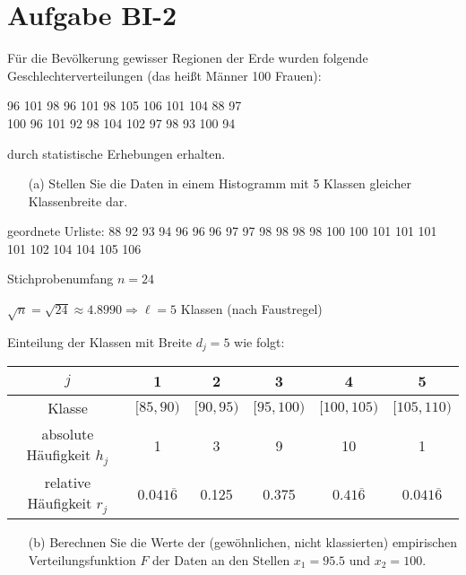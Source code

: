 
\section{Aufgabe BI-2}

\begin{task}
    Für die Bevölkerung gewisser Regionen der Erde wurden folgende Geschlechterverteilungen (das heißt Männer 100 Frauen):
    \begin{tightcenter}
        96  101  98  96  101  98  105  106  101  104  88  97 \\
        100  96  101  92  98  104  102  97  98  93  100  94
    \end{tightcenter}
    durch statistische Erhebungen erhalten.

    \begin{enumerate}
        \item[(a)] Stellen Sie die Daten in einem Histogramm mit 5 Klassen gleicher Klassenbreite dar.
    \end{enumerate}
\end{task}

geordnete Urliste: 88 92 93 94 96 96 96 97 97 98 98 98 98 100 100 101 101 101 101 102 104 104 105 106

Stichprobenumfang $n=24$

$\sqrt{n} = \sqrt{24} \approx 4.8990 \Rightarrow \ell=5$ Klassen (nach Faustregel)

Einteilung der Klassen mit Breite $d_j=5$ wie folgt:

\begin{table}[H]
\centering
\begin{tabular}{c|ccccc}
    $j$                       & 1                   & 2         & 3          & 4                  & 5                   \\ \hline
    Klasse                    & $[85,90)$           & $[90,95)$ & $[95,100)$ & $[100,105)$        & $[105,110)$         \\
    absolute Häufigkeit $h_j$ & 1                   & 3         & 9          & 10                 & 1                   \\
    relative Häufigkeit $r_j$ & $0.041\overline{6}$ & 0.125     & 0.375      & $0.41\overline{6}$ & $0.041\overline{6}$
\end{tabular}
\end{table}



\begin{task}
    \begin{enumerate}
        \item[(b)] Berechnen Sie die Werte der (gewöhnlichen, nicht klassierten) empirischen Verteilungsfunktion $F$ der Daten an den Stellen $x_1=95.5$ und $x_2=100$.
    \end{enumerate}
\end{task}

